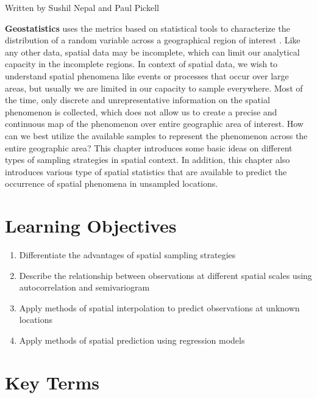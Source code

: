 \documentclass[
]{book}
\providecommand{\tightlist}{%
  \setlength{\itemsep}{0pt}\setlength{\parskip}{0pt}}
\begin{document}
Written by
Sushil Nepal and Paul Pickell

\textbf{Geostatistics} uses the metrics based on statistical tools to characterize the distribution of a random variable across a geographical region of interest \citep{getis_spatial_2004}. Like any other data, spatial data may be incomplete, which can limit our analytical capacity in the incomplete regions. In context of spatial data, we wish to understand spatial phenomena like events or processes that occur over large areas, but usually we are limited in our capacity to sample everywhere. Most of the time, only discrete and unrepresentative information on the spatial phenomenon is collected, which does not allow us to create a precise and continuous map of the phenomenon over entire geographic area of interest. How can we best utilize the available samples to represent the phenomenon across the entire geographic area? This chapter introduces some basic ideas on different types of sampling strategies in spatial context. In addition, this chapter also introduces various type of spatial statistics that are available to predict the occurrence of spatial phenomena in unsampled locations.

\hypertarget{learning-objectives-9}{%
\section*{Learning Objectives}\label{learning-objectives-9}}

\begin{enumerate}
\def\labelenumi{\arabic{enumi}.}
\tightlist
\item
  Differentiate the advantages of spatial sampling strategies
\item
  Describe the relationship between observations at different spatial scales using autocorrelation and semivariogram
\item
  Apply methods of spatial interpolation to predict observations at unknown locations
\item
  Apply methods of spatial prediction using regression models
\end{enumerate}

\hypertarget{key-terms-9}{%
\section*{Key Terms}\label{key-terms-9}}
\end{document}
